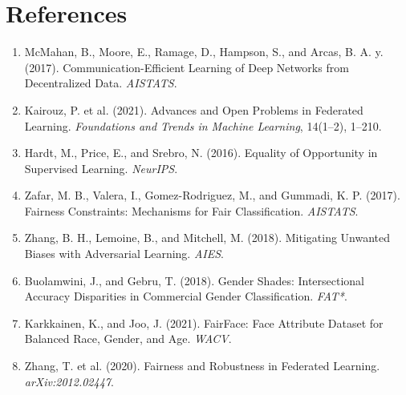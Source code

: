 \documentclass[11pt,a4paper]{article}
\begin{document}
\section*{References}
\begin{enumerate}
    \item McMahan, B., Moore, E., Ramage, D., Hampson, S., and Arcas, B. A. y. (2017). Communication-Efficient Learning of Deep Networks from Decentralized Data. \textit{AISTATS}.
    \item Kairouz, P. et al. (2021). Advances and Open Problems in Federated Learning. \textit{Foundations and Trends in Machine Learning}, 14(1--2), 1--210.
    \item Hardt, M., Price, E., and Srebro, N. (2016). Equality of Opportunity in Supervised Learning. \textit{NeurIPS}.
    \item Zafar, M. B., Valera, I., Gomez-Rodriguez, M., and Gummadi, K. P. (2017). Fairness Constraints: Mechanisms for Fair Classification. \textit{AISTATS}.
    \item Zhang, B. H., Lemoine, B., and Mitchell, M. (2018). Mitigating Unwanted Biases with Adversarial Learning. \textit{AIES}.
    \item Buolamwini, J., and Gebru, T. (2018). Gender Shades: Intersectional Accuracy Disparities in Commercial Gender Classification. \textit{FAT*}.
    \item Karkkainen, K., and Joo, J. (2021). FairFace: Face Attribute Dataset for Balanced Race, Gender, and Age. \textit{WACV}.
    \item Zhang, T. et al. (2020). Fairness and Robustness in Federated Learning. \textit{arXiv:2012.02447}.
\end{enumerate}
\end{document}
